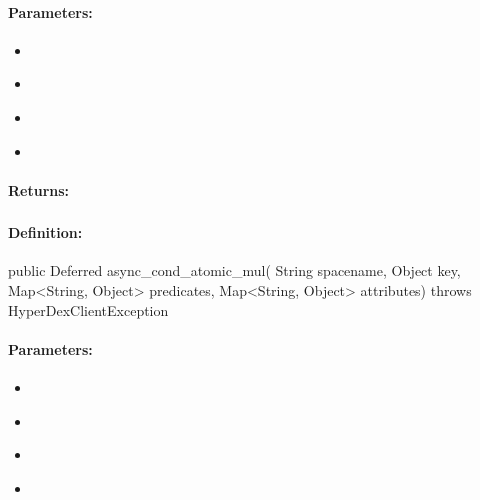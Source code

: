 \paragraph{Parameters:}
\begin{itemize}[noitemsep]
\item {}\\

\item {}\\

\item {}\\

\item {}\\

\end{itemize}

\paragraph{Returns:}


\pagebreak
\subsubsection{}
\label{api:java:async_cond_atomic_mul}


\paragraph{Definition:}
\begin{javacode}
public Deferred async_cond_atomic_mul(
        String spacename,
        Object key,
        Map<String, Object> predicates,
        Map<String, Object> attributes) throws HyperDexClientException
\end{javacode}

\paragraph{Parameters:}
\begin{itemize}[noitemsep]
\item {}\\

\item {}\\

\item {}\\

\item {}\\

\end{itemize}

